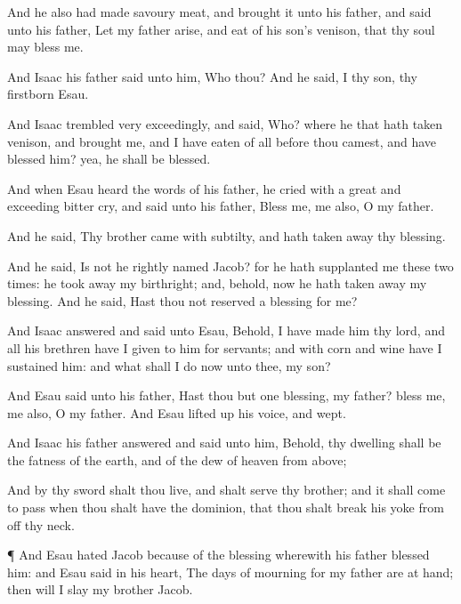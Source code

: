 {And he also had
made savoury
meat, and brought
it unto his
father, and
said unto his
father, Let my
father
arise, and
eat of his
son’s
venison, that thy
soul may
bless me.

And
Isaac his
father
said unto him, Who
{} thou? And he
said, I
{} thy
son, thy
firstborn
Esau.

And
Isaac
trembled
very
exceedingly, and
said, Who?
where
{} he that hath
taken
venison, and
brought
{} me, and I have
eaten of all before thou
camest, and have
blessed him? yea,
{} he shall be
blessed.

And when
Esau
heard the
words of his
father, he
cried with a
great and
exceeding
bitter
cry, and
said unto his
father,
Bless me,
{} me also, O my
father.

And he
said, Thy
brother
came with
subtilty, and hath taken
away thy
blessing.

And he
said, Is not he
rightly
named
Jacob? for he hath supplanted
me
these two
times: he took
away my
birthright; and, behold, now he hath taken
away my
blessing. And he
said, Hast thou not
reserved a
blessing for me?

And
Isaac
answered and
said unto
Esau, Behold, I have
made him thy
lord, and all his
brethren have I
given to him for
servants; and with
corn and
wine have I
sustained him: and what shall I
do
now unto thee, my
son?

And
Esau
said unto his
father, Hast thou but
one
blessing, my
father?
bless me,
{} me also, O my
father. And
Esau lifted
up his
voice, and
wept.

And
Isaac his
father
answered and
said unto him, Behold, thy
dwelling shall be the
fatness of the
earth, and of the
dew of
heaven from
above;

And by thy
sword shalt thou
live, and shalt
serve thy
brother; and it shall come to pass when thou shalt have the
dominion, that thou shalt
break his
yoke from off thy
neck.


\par }{\PP {}¶ And
Esau
hated
Jacob
because of the
blessing
wherewith his
father blessed
him: and
Esau
said in his
heart, The
days of
mourning for my
father are at
hand; then will I
slay my
brother
Jacob.

}
